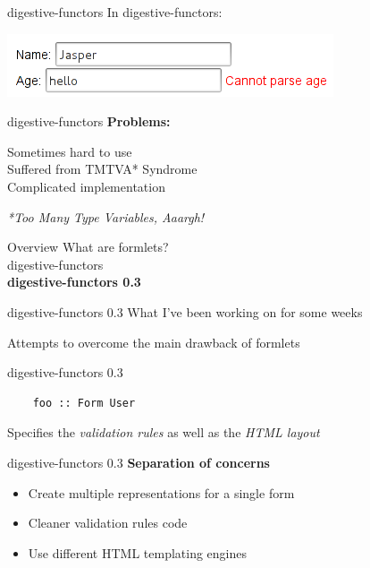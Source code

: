 \documentclass[20pt]{beamer}
\newcommand{\vspaced}{
    \vspace{5mm}
}
\begin{document}
\begin{frame}{digestive-functors}
    In digestive-functors:
    \vspaced
    \begin{center}
    \includegraphics[width=\textwidth]{images/errors-digestive-functors.png}
    \end{center}
\end{frame}

\begin{frame}{digestive-functors}
    \textbf{Problems:} \\
    \vspaced
    Sometimes hard to use \\
    Suffered from TMTVA* Syndrome \\
    Complicated implementation \\
    \vspaced
    \emph{*Too Many Type Variables, Aaargh!}
\end{frame}


\begin{frame}{Overview}
    What are formlets? \\
    digestive-functors \\
    \textbf{digestive-functors 0.3} \\
\end{frame}

\begin{frame}{digestive-functors 0.3}
    What I've been working on for some weeks \\
    \vspaced
    Attempts to overcome the main drawback of formlets
\end{frame}

\begin{frame}[fragile]{digestive-functors 0.3}
    \begin{lstlisting}
    foo :: Form User
    \end{lstlisting}
    \vspaced
    Specifies the \emph{validation rules} as well as the \emph{HTML layout}
\end{frame}

\begin{frame}{digestive-functors 0.3}
    \textbf{Separation of concerns}
    \vspaced
    \begin{itemize}
    \item Create multiple representations for a single form
    \item Cleaner validation rules code
    \item Use different HTML templating engines
    \end{itemize}
\end{frame}
\end{document}

